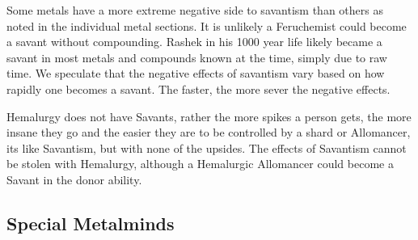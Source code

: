 \documentclass[conference]{IEEEtran}
\begin{document}
Some metals have a more extreme negative side to savantism than others as noted in the individual metal sections.
It is unlikely a Feruchemist could become a savant without compounding.\cite{miles-savant}  Rashek in his 1000 year life likely became a savant in most metals and compounds known at the time, simply due to raw time.\cite{lr-savant-al}  We speculate that the negative effects of savantism vary based on how rapidly one becomes a savant.  The faster, the more sever the negative effects.

Hemalurgy does not have Savants, rather the more spikes a person gets, the more insane they go and the easier they are to be controlled by a shard or Allomancer, its like Savantism, but with none of the upsides.\cite{WoA-CH47}   The effects of Savantism cannot be stolen with Hemalurgy,\cite{savant-no-steal} although a Hemalurgic Allomancer could become a Savant in the donor ability.\cite{HE-savant}

\subsection*{\textbf{Special Metalminds}}
\end{document}
